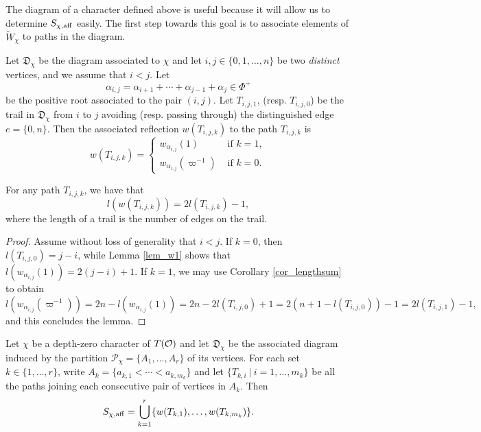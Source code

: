     The diagram of a character defined above is useful because it will allow us to determine $S_{\chi,\mathrm{aff}}$ easily. The first step towards this goal is to associate elements of $\widetilde{W}_\chi$ to paths in the diagram.

    \begin{definition}
        Let $\mathfrak{D}_\chi$ be the diagram associated to $\chi$ and let $i,j\in\{0,1,\ldots,n\}$ be two \textit{distinct} vertices, and we assume that $i<j$. Let 
        $$\alpha_{i,j}=\alpha_{i+1}+\cdots+\alpha_{j-1}+\alpha_j\in\Phi^+$$
        be the positive root associated to the pair $(i,j)$. Let $T_{i,j,1}$, (resp. $T_{i,j,0}$) be the trail in $\mathfrak{D}_\chi$ from $i$ to $j$ avoiding (resp. passing through) the distinguished edge $e=\{0,n\}$. Then the associated reflection $w(T_{i,j,k})$ to the path $T_{i,j,k}$ is
        \begin{equation*}
            w(T_{i,j,k})=
            \begin{cases}
                w_{\alpha_{i,j}}(1) &\text{ if } k=1,\\
                w_{\alpha_{i,j}}(\varpi^{-1}) &\text{ if } k=0.
            \end{cases}
        \end{equation*}
    \end{definition}

    \begin{lemma}
        For any path $T_{i,j,k}$, we have that 
        $$l(w(T_{i,j,k}))=2l(T_{i,j,k})-1,$$
        where the length of a trail is the number of edges on the trail.
    \end{lemma}
    \begin{proof}
        Assume without loss of generality that $i<j$. 
        If $k=0$, then $l(T_{i,j,0})=j-i$, while Lemma \ref{lem_w1} shows that $l(w_{\alpha_{i,j}}(1))=2(j-i)+1$. If $k=1$, we may use Corollary \ref{cor_lengthsum} to obtain
        $$l(w_{\alpha_{i,j}}(\varpi^{-1}))=2n-l(w_{\alpha_{i,j}}(1))=2n-2l(T_{i,j,0})+1=2(n+1-l(T_{i,j,0}))-1=2l(T_{i,j,1})-1,$$
        and this concludes the lemma.
    \end{proof}

    \begin{proposition}\label{prop_Schi}
        Let $\chi$ be a depth-zero character of $T(\mathcal{O})$ and let $\mathfrak{D}_\chi$ be the associated diagram induced by the partition $\mathcal{P}_\chi=\{A_1,\ldots,A_r\}$ of its vertices. For each set $k\in\{1,\ldots,r\}$, write $A_k=\{a_{k,1}<\cdots<a_{k,m_k}\}$ and let $\{T_{k,i}\ |\ i=1,\ldots,m_k\}$ be all the paths joining each consecutive pair of vertices in $A_k$. Then
        \begin{equation*}
            S_{\chi,\mathrm{aff}}=\bigcup_{k=1}^r \{w(T_{k,1}),\ldots,w(T_{k,m_k})\}.
        \end{equation*}
    \end{proposition}

